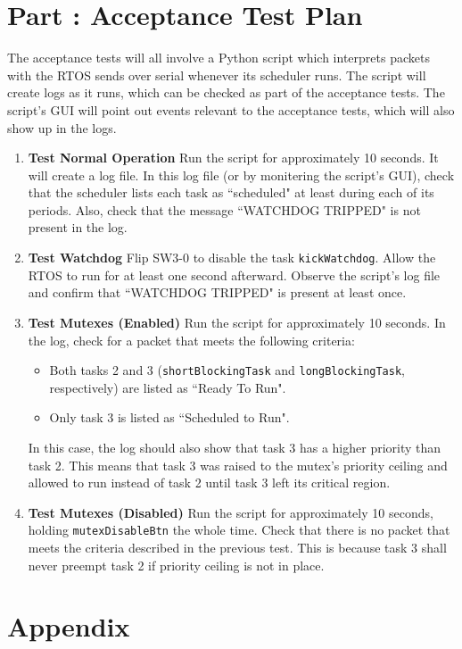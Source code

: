 \documentclass{article}
\newcounter{partNum}
\newcommand{\partNum}{%
        \stepcounter{partNum}%
        \thepartNum}
\newcommand{\sectPart}[1]{\section*{Part \partNum: #1}}
\newcommand{\bitem}[1]{\item \textbf{#1}}
\begin{document}

\sectPart{Acceptance Test Plan}

The acceptance tests will all involve a Python script which interprets packets with the RTOS sends over serial whenever its scheduler runs. The script will create logs as it runs, which can be checked as part of the acceptance tests. The script's GUI will point out events relevant to the acceptance tests, which will also show up in the logs.
\begin{enumerate}
    \bitem{Test Normal Operation} Run the script for approximately 10 seconds. It will create a log file. In this log file (or by monitering the script's GUI), check that the scheduler lists each task as ``scheduled" at least during each of its periods. Also, check that the message ``WATCHDOG TRIPPED" is not present in the log.
    \bitem{Test Watchdog} Flip SW3-0 to disable the task \texttt{kickWatchdog}. Allow the RTOS to run for at least one second afterward. Observe the script's log file and confirm that ``WATCHDOG TRIPPED" is present at least once.
    \bitem{Test Mutexes (Enabled)} Run the script for approximately 10 seconds. In the log, check for a packet that meets the following criteria:
        \begin{itemize}
            \item Both tasks 2 and 3 (\texttt{shortBlockingTask} and \texttt{longBlockingTask}, respectively) are listed as ``Ready To Run".
            \item Only task 3 is listed as ``Scheduled to Run".
        \end{itemize}
    In this case, the log should also show that task 3 has a higher priority than task 2. This means that task 3 was raised to the mutex's priority ceiling and allowed to run instead of task 2 until task 3 left its critical region.
    \bitem{Test Mutexes (Disabled)} Run the script for approximately 10 seconds, holding \texttt{mutexDisableBtn} the whole time. Check that there is no packet that meets the criteria described in the previous test. This is because task 3 shall never preempt task 2 if priority ceiling is not in place.
\end{enumerate}





\newpage

\section*{Appendix}
\end{document}

